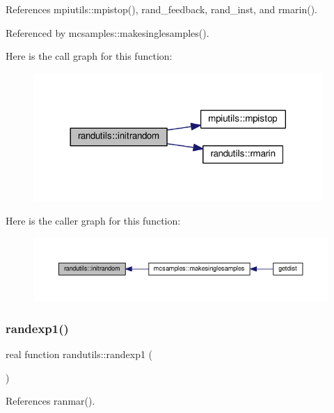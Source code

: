 References mpiutils\+::mpistop(), rand\+\_\+feedback, rand\+\_\+inst, and rmarin().



Referenced by mcsamples\+::makesinglesamples().

Here is the call graph for this function\+:
\nopagebreak
\begin{figure}[H]
\begin{center}
\leavevmode
\includegraphics[width=312pt]{namespacerandutils_a6f074e631d2bdae8023911e26f56d7aa_cgraph}
\end{center}
\end{figure}
Here is the caller graph for this function\+:
\nopagebreak
\begin{figure}[H]
\begin{center}
\leavevmode
\includegraphics[width=350pt]{namespacerandutils_a6f074e631d2bdae8023911e26f56d7aa_icgraph}
\end{center}
\end{figure}
\mbox{\label{namespacerandutils_a4ab2d2d677da8e5a41e18804782dd952}} 
\subsubsection{\texorpdfstring{randexp1()}{randexp1()}}
{\footnotesize\ttfamily real function randutils\+::randexp1 (\begin{DoxyParamCaption}{ }\end{DoxyParamCaption})}



References ranmar().



